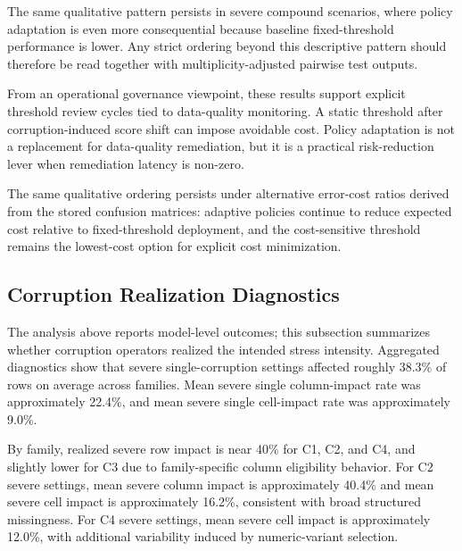 \documentclass{AuthorGuide/ijitcs}
\newcommand{\fittableinput}[1]{%
\begingroup
\setlength{\tabcolsep}{4pt}%
\resizebox{\textwidth}{!}{}%
\endgroup
}
\begin{document}
The same qualitative pattern persists in severe compound scenarios, where policy adaptation is even more consequential because baseline fixed-threshold performance is lower. Any strict ordering beyond this descriptive pattern should therefore be read together with multiplicity-adjusted pairwise test outputs.

From an operational governance viewpoint, these results support explicit threshold review cycles tied to data-quality monitoring. A static threshold after corruption-induced score shift can impose avoidable cost. Policy adaptation is not a replacement for data-quality remediation, but it is a practical risk-reduction lever when remediation latency is non-zero.

\begin{table}[!t]
\caption{Threshold-policy comparison for uncalibrated predictions with dataset-cluster bootstrap 95\% CIs (\(n=12\) clusters), from \texttt{../results/tables/table\_threshold\_policy\_comparison\_severe.csv}. Single-severe rows pool C2/C4 on all datasets and C3 on categorical-eligible datasets only; compound rows use C2+C4 at (0.4,0.4). The table reports explicit cluster counts (\(n_{\mathrm{single,cl}}\), \(n_{\mathrm{compound,cl}}\)). Positive $\Delta$F1 and negative $\Delta$Cost are improvements versus fixed-threshold \(t=0.5\).\label{tab:policytable}}
\centering
\scriptsize
\fittableinput{../results/tables/table_threshold_policy_comparison_severe.tex}
\end{table}

The same qualitative ordering persists under alternative error-cost ratios derived from the stored confusion matrices: adaptive policies continue to reduce expected cost relative to fixed-threshold deployment, and the cost-sensitive threshold remains the lowest-cost option for explicit cost minimization.

\subsection{Corruption Realization Diagnostics}
The analysis above reports model-level outcomes; this subsection summarizes whether corruption operators realized the intended stress intensity. Aggregated diagnostics show that severe single-corruption settings affected roughly 38.3\% of rows on average across families. Mean severe single column-impact rate was approximately 22.4\%, and mean severe single cell-impact rate was approximately 9.0\%.

By family, realized severe row impact is near 40\% for C1, C2, and C4, and slightly lower for C3 due to family-specific column eligibility behavior. For C2 severe settings, mean severe column impact is approximately 40.4\% and mean severe cell impact is approximately 16.2\%, consistent with broad structured missingness. For C4 severe settings, mean severe cell impact is approximately 12.0\%, with additional variability induced by numeric-variant selection.
\end{document}
